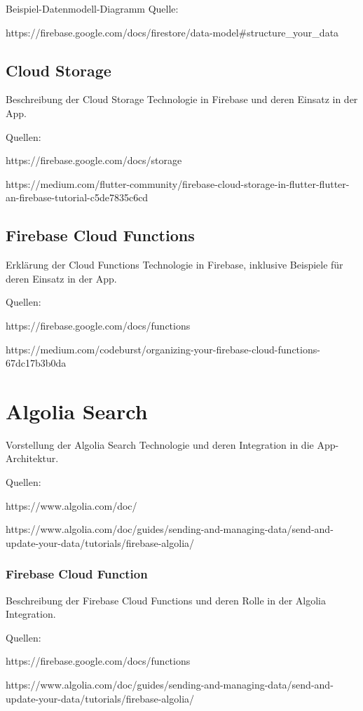 Beispiel-Datenmodell-Diagramm Quelle: 

https://firebase.google.com/docs/firestore/data-model\#structure\_your\_data

\subsection{Cloud Storage}

Beschreibung der Cloud Storage Technologie in Firebase und deren Einsatz in der App.

Quellen: 

https://firebase.google.com/docs/storage 

https://medium.com/flutter-community/firebase-cloud-storage-in-flutter-flutter-an-firebase-tutorial-c5de7835c6cd

\subsection{Firebase Cloud Functions}

Erklärung der Cloud Functions Technologie in Firebase, inklusive Beispiele für deren Einsatz in der App.

Quellen: 

https://firebase.google.com/docs/functions 

https://medium.com/codeburst/organizing-your-firebase-cloud-functions-67dc17b3b0da

\section{Algolia Search}

Vorstellung der Algolia Search Technologie und deren Integration in die App-Architektur.

Quellen: 

https://www.algolia.com/doc/ 

https://www.algolia.com/doc/guides/sending-and-managing-data/send-and-update-your-data/tutorials/firebase-algolia/

\subsubsection{Firebase Cloud Function}

Beschreibung der Firebase Cloud Functions und deren Rolle in der Algolia Integration.

Quellen: 

https://firebase.google.com/docs/functions

https://www.algolia.com/doc/guides/sending-and-managing-data/send-and-update-your-data/tutorials/firebase-algolia/
